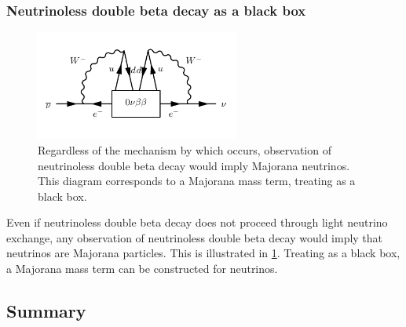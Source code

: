 \documentclass[herrin-thesis.tex]{subfiles}
\begin{document}
\subsubsection{Neutrinoless double beta decay as a black box}

\begin{figure}[tbp]
	\centering
	\includegraphics[width=0.6\textwidth]{./feynman_diagrams/zeronubetabeta_blackbox.pdf}
	\caption[Observation of \zeronu{} implies Majorana neutrinos]{Regardless of the mechanism by which \zeronu{} occurs, observation of neutrinoless double beta decay would imply Majorana neutrinos. This diagram corresponds to a Majorana mass term, treating \zeronu{} as a black box.}
	\label{fig:nu_blackbox}
\end{figure}

Even if neutrinoless double beta decay does not proceed through light neutrino exchange, any observation of neutrinoless double beta decay would imply that neutrinos are Majorana particles. This is illustrated in \cref{fig:nu_blackbox}. Treating \zeronu{} as a black box, a Majorana mass term can be constructed for neutrinos.

\subsection{Summary}
\end{document}
